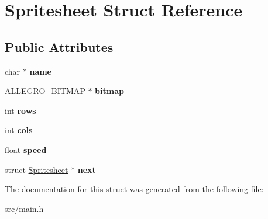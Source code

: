 \hypertarget{structSpritesheet}{\section{\-Spritesheet \-Struct \-Reference}
\label{structSpritesheet}
}
\subsection*{\-Public \-Attributes}
\begin{DoxyCompactItemize}
\item 
\hypertarget{structSpritesheet_a6788d53f825bd74cda7e50e75435befa}{char $\ast$ {\bfseries name}}\label{structSpritesheet_a6788d53f825bd74cda7e50e75435befa}

\item 
\hypertarget{structSpritesheet_ad31be6e59349586862e6a813ea139bcb}{\-A\-L\-L\-E\-G\-R\-O\-\_\-\-B\-I\-T\-M\-A\-P $\ast$ {\bfseries bitmap}}\label{structSpritesheet_ad31be6e59349586862e6a813ea139bcb}

\item 
\hypertarget{structSpritesheet_aeab321ce6cdd45cc8a5078e80480510e}{int {\bfseries rows}}\label{structSpritesheet_aeab321ce6cdd45cc8a5078e80480510e}

\item 
\hypertarget{structSpritesheet_a3d512755ce492a35e1816fe026cc37c9}{int {\bfseries cols}}\label{structSpritesheet_a3d512755ce492a35e1816fe026cc37c9}

\item 
\hypertarget{structSpritesheet_ad011770ca540de2bad85f0cb155c774b}{float {\bfseries speed}}\label{structSpritesheet_ad011770ca540de2bad85f0cb155c774b}

\item 
\hypertarget{structSpritesheet_a671f77f759138aa2c852e5252b6daac5}{struct \hyperlink{structSpritesheet}{\-Spritesheet} $\ast$ {\bfseries next}}\label{structSpritesheet_a671f77f759138aa2c852e5252b6daac5}

\end{DoxyCompactItemize}


\-The documentation for this struct was generated from the following file\-:\begin{DoxyCompactItemize}
\item 
src/\hyperlink{main_8h}{main.\-h}\end{DoxyCompactItemize}
